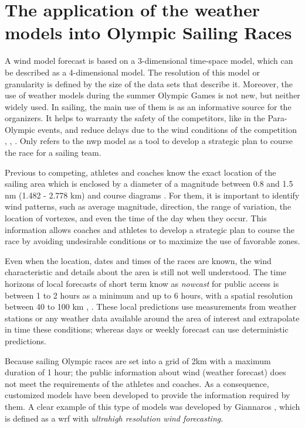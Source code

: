 \section{The application of the weather models into Olympic Sailing Races}

A wind model forecast is based on a 3-dimensional time-space model, which can be described as a 4-dimensional model. The resolution of this model or granularity is defined by the size of the data sets that describe it. Moreover, the use of weather models during the summer Olympic Games is not new, but neither widely used. In sailing, the main use of them is as an informative source for the organizers. It helps to warranty the safety of the competitors, like in the Para-Olympic events, and reduce delays due to the wind conditions of the competition  \cite{spark2004wind}, \cite{sheng2009structure}, \cite{golding2014forecasting}. Only \cite{giannaros2018ultrahigh} refers to the \acrshort{nwp} model as a tool to develop a strategic plan to course the race for a sailing team. \par 

Previous to competing, athletes and coaches know the exact location of the sailing area which is enclosed by a diameter of a magnitude between 0.8 and 1.5 nm (1.482 - 2.778 km) and course diagrams \cite{SailRaceRio}. For them, it is important to identify wind patterns, such as average magnitude, direction, the range of variation, the location of vortexes, and even the time of the day when they occur. This information allows coaches and athletes to develop a strategic plan to course the race by avoiding undesirable conditions or to maximize the use of favorable zones.\par

Even when the location, dates and times of the races are known, the wind characteristic and details about the area is still not well understood. The time horizons of local forecasts of short term know as \textit{nowcast} for public access is between 1 to 2 hours as a minimum and up to 6 hours, with a spatial resolution between 40 to 100 km \cite{warner2010numerical}, \cite{kristensen2010weather}. These local predictions use measurements from weather stations or any weather data available around the area of interest and extrapolate in time these conditions; whereas days or weekly forecast can use deterministic predictions.\par

Because sailing Olympic races are set into a grid of 2km with a maximum duration of 1 hour; the public information about wind (weather forecast) does not meet the requirements of the athletes and coaches. As a consequence, customized models have been developed to provide the information required by them. A clear example of this type of models was developed by Giannaros \cite{giannaros2018ultrahigh}, which is defined as a \acrshort{wrf} with \textit{ultrahigh resolution wind forecasting}.\par 

